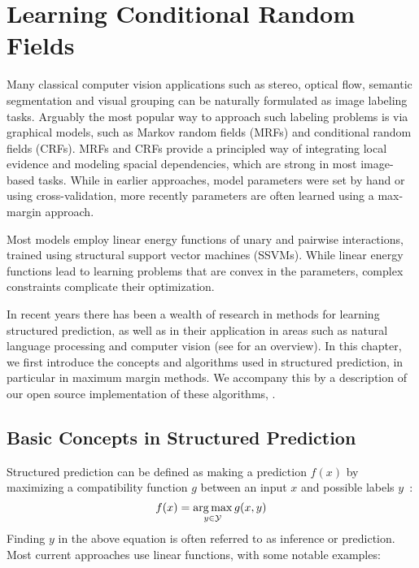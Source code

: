 \chapter{Learning Conditional Random Fields}\label{ch:structured_pystruct}

Many classical computer vision applications such as stereo, optical flow, semantic
segmentation and visual grouping can be naturally formulated as image labeling tasks.
%
Arguably the most popular way to approach such labeling problems is via graphical
models, such as Markov random fields (MRFs) and conditional random fields (CRFs).
MRFs and CRFs provide a principled way of integrating local evidence and
modeling spacial dependencies, which are strong in most image-based tasks.
%
While in earlier approaches, model parameters were set by hand or using
cross-validation, more recently parameters are often learned using a max-margin
approach.

Most models employ linear energy functions of unary and pairwise interactions,
trained using structural support vector machines (SSVMs). While linear energy
functions lead to learning problems that are convex in the parameters, complex
constraints complicate their optimization.  %

In recent years there has been a wealth of research in methods for learning
structured prediction, as well as in their application in areas such as natural
language processing and computer vision (see \citet{nowozin2011structured} %
for an overview).
%
In this chapter, we first introduce the concepts and algorithms used in
structured prediction, in particular in maximum margin methods. We 
accompany this by a description of our open source implementation of these
algorithms, \pystruct.

\section{Basic Concepts in Structured Prediction}

Structured prediction can be defined as making a prediction $f(x)$ by maximizing a
compatibility function $g$ between an input $x$ and possible labels
$y$~\citep{nowozin2011structured}:
\begin{equation}
    f(x) = \operatorname*{arg\,max}_{y \in \mathcal{Y}} g(x, y)
\end{equation}
Finding $y$ in the above equation is often referred to as inference
or prediction.
Most current approaches use linear functions,
with some notable examples: %

